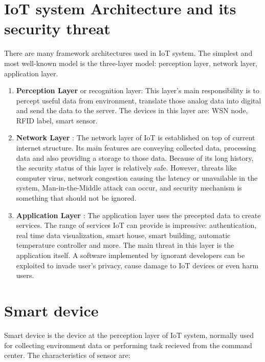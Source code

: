 \section{IoT system Architecture and its security threat}
There are many framework architectures used in IoT system. The simplest and most well-known model is the three-layer model: perception layer, network layer, application layer.  

\begin{enumerate}
    \item \textbf{Perception Layer} or recognition layer: This layer’s main responsibility is to percept useful data from environment, translate those analog data into digital and send the data to the server.  The devices in this layer are: WSN node, RFID label, smart sensor. 
    \item \textbf{Network Layer} : The network layer of IoT is established on top of current internet structure. Its main features are conveying collected data, processing data and also providing a storage to those data. Because of its long history, the security status of this layer is relatively safe. However, threats like computer virus, network congestion causing the latency or unavailable in the system, Man-in-the-Middle attack can occur, and security mechanism is something that should not be ignored.\parencite{STAGE:6188257}
    \item \textbf{Application Layer} : The application layer uses the precepted data to create services. The range of services IoT can provide is impressive: authentication, real time data visualization, smart house, smart building, automatic temperature controller and more. The main threat in this layer is the application itself. A software implemented by ignorant developers can be exploited to invade user’s privacy, cause damage to IoT devices or even harm users. \parencite{STAGE:6188257}
\end{enumerate}

\section{Smart device}
Smart device is the device at the perception layer of IoT system, 
normally used for collecting environment data or performing task recieved from the command center. 
The characteristics of sensor are: 

